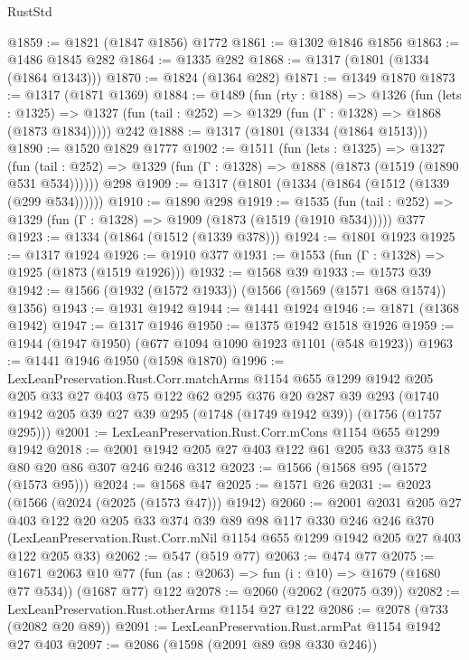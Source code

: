 \begin{lexlean}{RustStd}
\begin{coremodule}
@1859 := @1821 (@1847 @1856) @1772
@1861 := @1302 @1846 @1856
@1863 := @1486 @1845 @282
@1864 := @1335 @282
@1868 := @1317 (@1801 (@1334 (@1864 @1343)))
@1870 := @1824 (@1364 @282)
@1871 := @1349 @1870
@1873 := @1317 (@1871 @1369)
@1884 := @1489
    (fun (rty : @188) =>
    @1326
      (fun (lets : @1325) =>
      @1327 (fun (tail : @252) => @1329 (fun (Γ : @1328) => @1868 (@1873 @1834)))))
    @242
@1888 := @1317 (@1801 (@1334 (@1864 @1513)))
@1890 := @1520 @1829 @1777
@1902 := @1511
    (fun (lets : @1325) =>
    @1327 (fun (tail : @252) => @1329 (fun (Γ : @1328) => @1888 (@1873 (@1519 (@1890 @531 @534))))))
    @298
@1909 := @1317 (@1801 (@1334 (@1864 (@1512 (@1339 (@299 @534))))))
@1910 := @1890 @298
@1919 := @1535
    (fun (tail : @252) => @1329 (fun (Γ : @1328) => @1909 (@1873 (@1519 (@1910 @534)))))
    @377
@1923 := @1334 (@1864 (@1512 (@1339 @378)))
@1924 := @1801 @1923
@1925 := @1317 @1924
@1926 := @1910 @377
@1931 := @1553 (fun (Γ : @1328) => @1925 (@1873 (@1519 @1926)))
@1932 := @1568 @39
@1933 := @1573 @39
@1942 := @1566 (@1932 (@1572 @1933)) (@1566 (@1569 (@1571 @68 @1574)) @1356)
@1943 := @1931 @1942
@1944 := @1441 @1924
@1946 := @1871 (@1368 @1942)
@1947 := @1317 @1946
@1950 := @1375 @1942 @1518 @1926
@1959 := @1944 (@1947 @1950) (@677 @1094 @1090 @1923 @1101 (@548 @1923))
@1963 := @1441 @1946 @1950 (@1598 @1870)
@1996 := LexLeanPreservation.Rust.Corr.matchArms
    @1154
    @655
    @1299
    @1942
    @205
    @205
    @33
    @27
    @403
    @75
    @122
    @62
    @295
    @376
    @20
    @287
    @39
    @293
    (@1740 @1942 @205 @39 @27 @39 @295 (@1748 (@1749 @1942 @39)) (@1756 (@1757 @295)))
@2001 := LexLeanPreservation.Rust.Corr.mCons @1154 @655 @1299 @1942
@2018 := @2001 @1942 @205 @27 @403 @122 @61 @205 @33 @375 @18 @80 @20 @86 @307 @246 @246 @312
@2023 := @1566 (@1568 @95 (@1572 (@1573 @95)))
@2024 := @1568 @47
@2025 := @1571 @26
@2031 := @2023 (@1566 (@2024 (@2025 (@1573 @47))) @1942)
@2060 := @2001
    @2031
    @205
    @27
    @403
    @122
    @20
    @205
    @33
    @374
    @39
    @89
    @98
    @117
    @330
    @246
    @246
    @370
    (LexLeanPreservation.Rust.Corr.mNil @1154 @655 @1299 @1942 @205 @27 @403 @122 @205 @33)
@2062 := @547 (@519 @77)
@2063 := @474 @77
@2075 := @1671
    @2063
    @10
    @77
    (fun (as : @2063) => fun (i : @10) => @1679 (@1680 @77 @534))
    (@1687 @77)
    @122
@2078 := @2060 (@2062 (@2075 @39))
@2082 := LexLeanPreservation.Rust.otherArms @1154 @27 @122
@2086 := @2078 (@733 (@2082 @20 @89))
@2091 := LexLeanPreservation.Rust.armPat @1154 @1942 @27 @403
@2097 := @2086 (@1598 (@2091 @89 @98 @330 @246))

\end{coremodule}
\end{lexlean}
